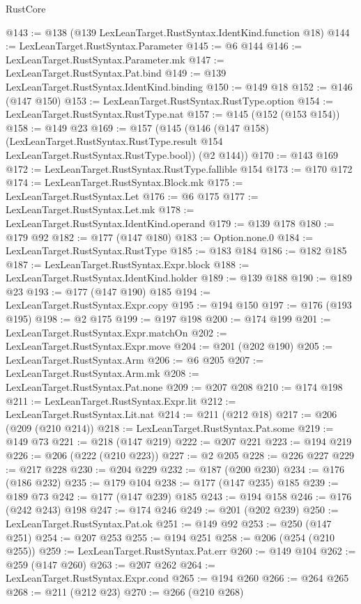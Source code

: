 \begin{lexlean}{RustCore}
\begin{coremodule}
@143 := @138 (@139 LexLeanTarget.RustSyntax.IdentKind.function @18)
@144 := LexLeanTarget.RustSyntax.Parameter
@145 := @6 @144
@146 := LexLeanTarget.RustSyntax.Parameter.mk
@147 := LexLeanTarget.RustSyntax.Pat.bind
@149 := @139 LexLeanTarget.RustSyntax.IdentKind.binding
@150 := @149 @18
@152 := @146 (@147 @150)
@153 := LexLeanTarget.RustSyntax.RustType.option
@154 := LexLeanTarget.RustSyntax.RustType.nat
@157 := @145 (@152 (@153 @154))
@158 := @149 @23
@169 := @157
    (@145
      (@146
        (@147 @158)
        (LexLeanTarget.RustSyntax.RustType.result @154 LexLeanTarget.RustSyntax.RustType.bool))
      (@2 @144))
@170 := @143 @169
@172 := LexLeanTarget.RustSyntax.RustType.fallible @154
@173 := @170 @172
@174 := LexLeanTarget.RustSyntax.Block.mk
@175 := LexLeanTarget.RustSyntax.Let
@176 := @6 @175
@177 := LexLeanTarget.RustSyntax.Let.mk
@178 := LexLeanTarget.RustSyntax.IdentKind.operand
@179 := @139 @178
@180 := @179 @92
@182 := @177 (@147 @180)
@183 := Option.none.{0}
@184 := LexLeanTarget.RustSyntax.RustType
@185 := @183 @184
@186 := @182 @185
@187 := LexLeanTarget.RustSyntax.Expr.block
@188 := LexLeanTarget.RustSyntax.IdentKind.holder
@189 := @139 @188
@190 := @189 @23
@193 := @177 (@147 @190) @185
@194 := LexLeanTarget.RustSyntax.Expr.copy
@195 := @194 @150
@197 := @176 (@193 @195)
@198 := @2 @175
@199 := @197 @198
@200 := @174 @199
@201 := LexLeanTarget.RustSyntax.Expr.matchOn
@202 := LexLeanTarget.RustSyntax.Expr.move
@204 := @201 (@202 @190)
@205 := LexLeanTarget.RustSyntax.Arm
@206 := @6 @205
@207 := LexLeanTarget.RustSyntax.Arm.mk
@208 := LexLeanTarget.RustSyntax.Pat.none
@209 := @207 @208
@210 := @174 @198
@211 := LexLeanTarget.RustSyntax.Expr.lit
@212 := LexLeanTarget.RustSyntax.Lit.nat
@214 := @211 (@212 @18)
@217 := @206 (@209 (@210 @214))
@218 := LexLeanTarget.RustSyntax.Pat.some
@219 := @149 @73
@221 := @218 (@147 @219)
@222 := @207 @221
@223 := @194 @219
@226 := @206 (@222 (@210 @223))
@227 := @2 @205
@228 := @226 @227
@229 := @217 @228
@230 := @204 @229
@232 := @187 (@200 @230)
@234 := @176 (@186 @232)
@235 := @179 @104
@238 := @177 (@147 @235) @185
@239 := @189 @73
@242 := @177 (@147 @239) @185
@243 := @194 @158
@246 := @176 (@242 @243) @198
@247 := @174 @246
@249 := @201 (@202 @239)
@250 := LexLeanTarget.RustSyntax.Pat.ok
@251 := @149 @92
@253 := @250 (@147 @251)
@254 := @207 @253
@255 := @194 @251
@258 := @206 (@254 (@210 @255))
@259 := LexLeanTarget.RustSyntax.Pat.err
@260 := @149 @104
@262 := @259 (@147 @260)
@263 := @207 @262
@264 := LexLeanTarget.RustSyntax.Expr.cond
@265 := @194 @260
@266 := @264 @265
@268 := @211 (@212 @23)
@270 := @266 (@210 @268)

\end{coremodule}
\end{lexlean}
